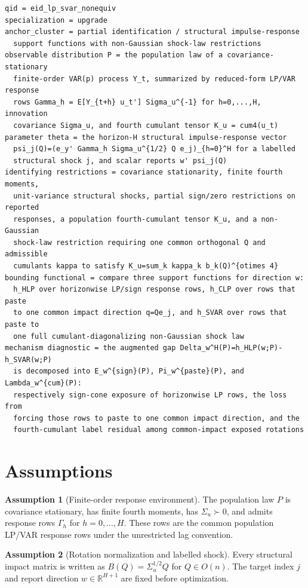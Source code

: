 \documentclass[11pt]{article}
\newcommand{\R}{\mathbb{R}}
\theoremstyle{definition}
\newtheorem{assumption}{Assumption}
\theoremstyle{plain}
\theoremstyle{remark}
\begin{document}
\begin{verbatim}
qid = eid_lp_svar_nonequiv
specialization = upgrade
anchor_cluster = partial identification / structural impulse-response
  support functions with non-Gaussian shock-law restrictions
observable distribution P = the population law of a covariance-stationary
  finite-order VAR(p) process Y_t, summarized by reduced-form LP/VAR response
  rows Gamma_h = E[Y_{t+h} u_t'] Sigma_u^{-1} for h=0,...,H, innovation
  covariance Sigma_u, and fourth cumulant tensor K_u = cum4(u_t)
parameter theta = the horizon-H structural impulse-response vector
  psi_j(Q)=(e_y' Gamma_h Sigma_u^{1/2} Q e_j)_{h=0}^H for a labelled
  structural shock j, and scalar reports w' psi_j(Q)
identifying restrictions = covariance stationarity, finite fourth moments,
  unit-variance structural shocks, partial sign/zero restrictions on reported
  responses, a population fourth-cumulant tensor K_u, and a non-Gaussian
  shock-law restriction requiring one common orthogonal Q and admissible
  cumulants kappa to satisfy K_u=sum_k kappa_k b_k(Q)^{otimes 4}
bounding functional = compare three support functions for direction w:
  h_HLP over horizonwise LP/sign response rows, h_CLP over rows that paste
  to one common impact direction q=Qe_j, and h_SVAR over rows that paste to
  one full cumulant-diagonalizing non-Gaussian shock law
mechanism diagnostic = the augmented gap Delta_w^H(P)=h_HLP(w;P)-h_SVAR(w;P)
  is decomposed into E_w^{sign}(P), Pi_w^{paste}(P), and Lambda_w^{cum}(P):
  respectively sign-cone exposure of horizonwise LP rows, the loss from
  forcing those rows to paste to one common impact direction, and the
  fourth-cumulant label residual among common-impact exposed rotations
\end{verbatim}

\section{Assumptions}
\begin{assumption}[Finite-order response environment]\label{ass:finite-response}
The population law \(P\) is covariance stationary, has finite fourth moments, has \(\Sigma_u\succ0\), and admits response rows \(\Gamma_h\) for \(h=0,\ldots,H\).  These rows are the common population LP/VAR response rows under the unrestricted lag convention.
\end{assumption}

\begin{assumption}[Rotation normalization and labelled shock]\label{ass:rotation-label}
Every structural impact matrix is written as \(B(Q)=\Sigma_u^{1/2}Q\) for \(Q\in O(n)\).  The target index \(j\) and report direction \(w\in\R^{H+1}\) are fixed before optimization.
\end{assumption}
\end{document}
